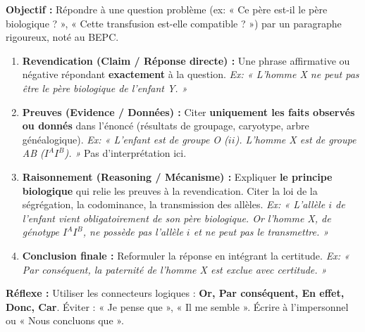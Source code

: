 \documentclass[11pt]{article}
\begin{document}
\begin{methode}
    \textbf{Objectif :} Répondre à une question problème (ex: « Ce père est-il le père biologique ? », « Cette transfusion est-elle compatible ? ») par un paragraphe rigoureux, noté au BEPC.
    \begin{enumerate}
        \item \textbf{Revendication (Claim / Réponse directe) :} Une phrase affirmative ou négative répondant \textbf{exactement} à la question. \emph{Ex: « L'homme X ne peut pas être le père biologique de l'enfant Y. »}
        \item \textbf{Preuves (Evidence / Données) :} Citer \textbf{uniquement les faits observés ou donnés} dans l'énoncé (résultats de groupage, caryotype, arbre généalogique). \emph{Ex: « L'enfant est de groupe O ($ii$). L'homme X est de groupe AB ($I^A I^B$). »} Pas d'interprétation ici.
        \item \textbf{Raisonnement (Reasoning / Mécanisme) :} Expliquer \textbf{le principe biologique} qui relie les preuves à la revendication. Citer la loi de la ségrégation, la codominance, la transmission des allèles. \emph{Ex: « L'allèle $i$ de l'enfant vient obligatoirement de son père biologique. Or l'homme X, de génotype $I^A I^B$, ne possède pas l'allèle $i$ et ne peut pas le transmettre. »}
        \item \textbf{Conclusion finale :} Reformuler la réponse en intégrant la certitude. \emph{Ex: « Par conséquent, la paternité de l'homme X est exclue avec certitude. »}
    \end{enumerate}
    \textbf{Réflexe :} Utiliser les connecteurs logiques : \textbf{Or, Par conséquent, En effet, Donc, Car}. Éviter : « Je pense que », « Il me semble ». Écrire à l'impersonnel ou « Nous concluons que ».
\end{methode}
\end{document}
